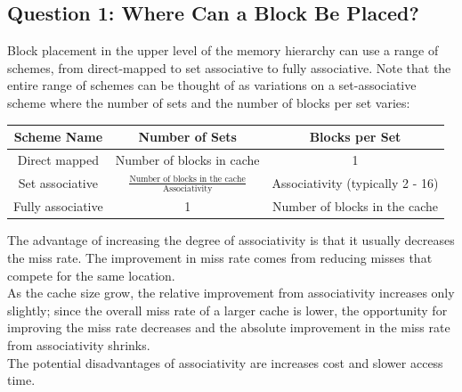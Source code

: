 \documentclass[12pt]{article}
\theoremstyle{definition}
\begin{document}
  \subsection{Question 1: Where Can a Block Be Placed?}
  Block placement in the upper level of the memory hierarchy can use a range of schemes, from direct-mapped to set associative to fully associative.
  Note that the entire range of schemes can be thought of as variations on a set-associative scheme where the number of sets and the number of blocks per set varies:
  \begin{center}
  \begin{tabular}{| c | c | c |}
  \hline
  Scheme Name & Number of Sets & Blocks per Set \\
  \hline
  {\small Direct mapped} & {\small Number of blocks in cache} & {\small 1} \\
  \hline
  {\small Set associative}
  & $\frac{\text{Number of blocks in the cache}}{\text{Associativity}}$
  & {\small Associativity (typically 2 - 16)} \\
  \hline
  {\small Fully associative} & {\small 1} & {\small Number of blocks in the cache} \\
  \hline
  \end{tabular}
  \end{center}
  The advantage of increasing the degree of associativity is that it usually decreases the miss rate.
  The improvement in miss rate comes from reducing misses that compete for the same location. \\
  As the cache size grow, the relative improvement from associativity increases only slightly;
  since the overall miss rate of a larger cache is lower, the opportunity for improving the miss rate decreases and the absolute improvement in the miss rate from associativity shrinks. \\
  The potential disadvantages of associativity are increases cost and slower access time.
\end{document}
